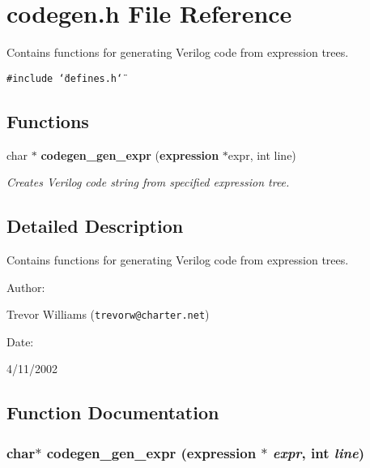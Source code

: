 \section{codegen.h File Reference}
\label{codegen_8h}
Contains functions for generating Verilog code from expression trees. 


{\tt \#include \char`\"{}defines.h\char`\"{}}\par
\subsection*{Functions}
\begin{CompactItemize}
\item 
char $\ast$ {\bf codegen\_\-gen\_\-expr} ({\bf expression} $\ast$expr, int line)
\begin{CompactList}\small\item\em Creates Verilog code string from specified expression tree.\item\end{CompactList}\end{CompactItemize}


\subsection{Detailed Description}
Contains functions for generating Verilog code from expression trees.



\begin{Desc}
\item[Author: ]\par
Trevor Williams ({\tt trevorw@charter.net}) \end{Desc}
\begin{Desc}
\item[Date: ]\par
4/11/2002\end{Desc}


\subsection{Function Documentation}
\subsubsection{\setlength{\rightskip}{0pt plus 5cm}char$\ast$ codegen\_\-gen\_\-expr ({\bf expression} $\ast$ {\em expr}, int {\em line})}\label{codegen_8h_a0}


